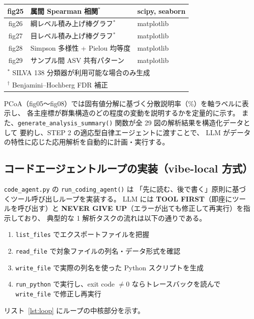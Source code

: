 \documentclass[12pt, a4paper]{article}
\begin{document}
\begin{table}[h]
\begin{tabular}{clp{5.5cm}}
    fig25 & 属間 Spearman 相関$^*$ & scipy, seaborn \\
    \midrule
    fig26 & 綱レベル積み上げ棒グラフ$^*$ & matplotlib \\
    fig27 & 目レベル積み上げ棒グラフ$^*$ & matplotlib \\
    fig28 & Simpson 多様性 + Pielou 均等度 & matplotlib \\
    fig29 & サンプル間 ASV 共有パターン & matplotlib \\
    \bottomrule
    \multicolumn{3}{l}{\small $^*$ SILVA 138 分類器が利用可能な場合のみ生成} \\
    \multicolumn{3}{l}{\small $^{\dagger}$ Benjamini--Hochberg FDR 補正}
  \end{tabular}
\end{table}

PCoA（fig05〜fig08）では固有値分解に基づく分散説明率（\%）を軸ラベルに表示し、
各主座標が群集構造のどの程度の変動を説明するかを定量的に示す。
また、\texttt{generate\_analysis\_summary()} 関数が全 29 図の解析結果を構造化データとして
要約し、STEP 2 の適応型自律エージェントに渡すことで、
LLM がデータの特性に応じた応用解析を自動的に計画・実行する。

\subsection{コードエージェントループの実装（vibe-local 方式）}

\texttt{code\_agent.py} の \texttt{run\_coding\_agent()} は
「先に読む、後で書く」原則に基づくツール呼び出しループを実装する。
LLM には \textbf{TOOL FIRST}（即座にツールを呼び出す）と
\textbf{NEVER GIVE UP}（エラーが出ても修正して再実行）を指示しており、
典型的な 1 解析タスクの流れは以下の通りである。

\begin{enumerate}[leftmargin=2em]
  \item \texttt{list\_files} でエクスポートファイルを把握
  \item \texttt{read\_file} で対象ファイルの列名・データ形式を確認
  \item \texttt{write\_file} で実際の列名を使った Python スクリプトを生成
  \item \texttt{run\_python} で実行し、exit code $\neq 0$ ならトレースバックを読んで
    \texttt{write\_file} で修正し再実行
\end{enumerate}

リスト~\ref{lst:loop} にループの中核部分を示す。
\end{document}
